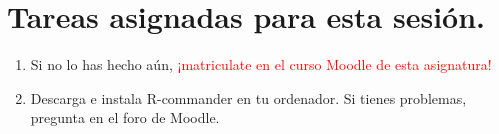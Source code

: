 \documentclass[10pt,a4paper]{article}
\begin{document}
\section{Tareas asignadas para esta sesión.}

\begin{enumerate}
\item Si no lo has hecho aún, \textcolor{red}{¡matriculate en el curso Moodle de esta asignatura!}
\item Descarga e instala R-commander en tu ordenador. Si tienes problemas, pregunta en el foro de Moodle.
\
\end{enumerate}
\end{document}
